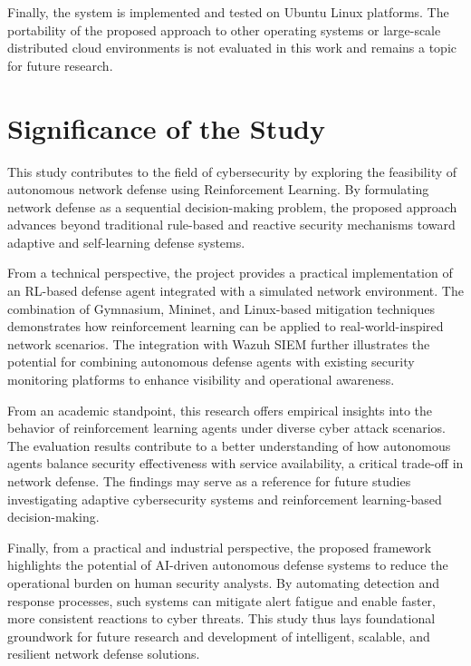 \documentclass[12pt,a4paper]{report}
\begin{document}
Finally, the system is implemented and tested on Ubuntu Linux platforms.
The portability of the proposed approach to other operating systems or large-scale distributed cloud environments is not evaluated in this work and remains a topic for future research.

\section{Significance of the Study}

This study contributes to the field of cybersecurity by exploring the feasibility of autonomous network defense using Reinforcement Learning.
By formulating network defense as a sequential decision-making problem, the proposed approach advances beyond traditional rule-based and reactive security mechanisms toward adaptive and self-learning defense systems.

From a technical perspective, the project provides a practical implementation of an RL-based defense agent integrated with a simulated network environment.
The combination of Gymnasium, Mininet, and Linux-based mitigation techniques demonstrates how reinforcement learning can be applied to real-world-inspired network scenarios.
The integration with Wazuh SIEM further illustrates the potential for combining autonomous defense agents with existing security monitoring platforms to enhance visibility and operational awareness.

From an academic standpoint, this research offers empirical insights into the behavior of reinforcement learning agents under diverse cyber attack scenarios.
The evaluation results contribute to a better understanding of how autonomous agents balance security effectiveness with service availability, a critical trade-off in network defense.
The findings may serve as a reference for future studies investigating adaptive cybersecurity systems and reinforcement learning-based decision-making.

Finally, from a practical and industrial perspective, the proposed framework highlights the potential of AI-driven autonomous defense systems to reduce the operational burden on human security analysts.
By automating detection and response processes, such systems can mitigate alert fatigue and enable faster, more consistent reactions to cyber threats.
This study thus lays foundational groundwork for future research and development of intelligent, scalable, and resilient network defense solutions.

\end{document}
